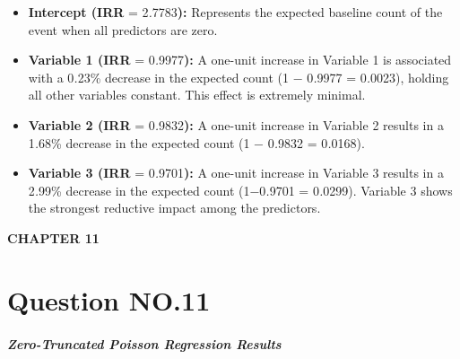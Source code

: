 \begin{itemize}
\item
  \textbf{Intercept (IRR} = 2\emph{.}7783\textbf{):} Represents the
  expected baseline count of the event when all predictors are zero.
\item
  \textbf{Variable 1 (IRR} = 0\emph{.}9977\textbf{):} A one-unit
  increase in Variable 1 is associated with a 0\emph{.}23\% decrease in
  the expected count (1 − 0\emph{.}9977 = 0\emph{.}0023), holding all
  other variables constant. This effect is extremely minimal.
\item
  \textbf{Variable 2 (IRR} = 0\emph{.}9832\textbf{):} A one-unit
  increase in Variable 2 results in a 1\emph{.}68\% decrease in the
  expected count (1 − 0\emph{.}9832 = 0\emph{.}0168).
\item
  \textbf{Variable 3 (IRR} = 0\emph{.}9701\textbf{):} A one-unit
  increase in Variable 3 results in a 2\emph{.}99\% decrease in the
  expected count (1−0\emph{.}9701 = 0\emph{.}0299). Variable 3 shows the
  strongest reductive impact among the predictors.
\end{itemize}

\textbf{CHAPTER 11}

\section{Question NO.11}\label{question-no.11}

\subparagraph{Zero-Truncated Poisson Regression
Results}\label{zero-truncated-poisson-regression-results}

